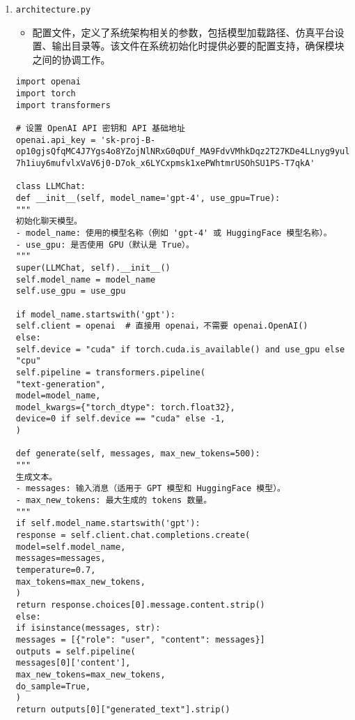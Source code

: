 \begin{enumerate}
\begin{verbatim}
	\end{verbatim}
	
	\item \texttt{architecture.py}
	\begin{itemize}
		\item 配置文件，定义了系统架构相关的参数，包括模型加载路径、仿真平台设置、输出目录等。该文件在系统初始化时提供必要的配置支持，确保模块之间的协调工作。
	\end{itemize}
	\begin{verbatim}
import openai
import torch
import transformers

# 设置 OpenAI API 密钥和 API 基础地址
openai.api_key = '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'

class LLMChat:
def __init__(self, model_name='gpt-4', use_gpu=True):
"""
初始化聊天模型。
- model_name: 使用的模型名称（例如 'gpt-4' 或 HuggingFace 模型名称）。
- use_gpu: 是否使用 GPU（默认是 True）。
"""
super(LLMChat, self).__init__()
self.model_name = model_name
self.use_gpu = use_gpu

if model_name.startswith('gpt'):
self.client = openai  # 直接用 openai，不需要 openai.OpenAI()
else:
self.device = "cuda" if torch.cuda.is_available() and use_gpu else "cpu"
self.pipeline = transformers.pipeline(
"text-generation",
model=model_name,
model_kwargs={"torch_dtype": torch.float32},
device=0 if self.device == "cuda" else -1,
)

def generate(self, messages, max_new_tokens=500):
"""
生成文本。
- messages: 输入消息（适用于 GPT 模型和 HuggingFace 模型）。
- max_new_tokens: 最大生成的 tokens 数量。
"""
if self.model_name.startswith('gpt'):
response = self.client.chat.completions.create(
model=self.model_name,
messages=messages,
temperature=0.7,
max_tokens=max_new_tokens,
)
return response.choices[0].message.content.strip()
else:
if isinstance(messages, str):
messages = [{"role": "user", "content": messages}]
outputs = self.pipeline(
messages[0]['content'],
max_new_tokens=max_new_tokens,
do_sample=True,
)
return outputs[0]["generated_text"].strip()

	\end{verbatim}
\end{enumerate}

